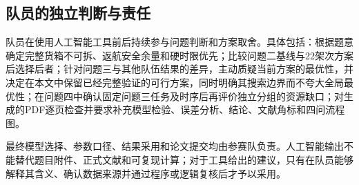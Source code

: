 \subsection{队员的独立判断与责任}
队员在使用人工智能工具前后持续参与问题判断和方案取舍。具体包括：根据题意确定完整货箱不可拆、返航安全余量和硬时限优先；比较问题二基线与22架次方案后选择后者；针对问题三与其他队伍结果的差异，主动质疑当前方案的最优性，并决定在本文中保留已经完整验证的可行方案，同时明确其搜索边界而不夸大全局最优性；在问题四中确认固定问题三任务及时序后再评价独立分组的资源缺口；对生成的PDF逐页检查并要求补充模型检验、误差分析、结论、文献角标和四问流程图。

最终模型选择、参数口径、结果采用和论文提交均由参赛队负责。人工智能输出不能替代题目附件、正式文献和可复现计算；对于工具给出的建议，只有在队员能够解释其含义、确认数据来源并通过程序或逻辑复核后才予以采用。
